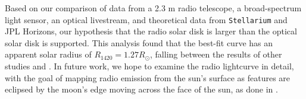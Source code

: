 Based on our comparison of data from a 2.3 m radio telescope, a broad-spectrum light sensor, an optical livestream, and theoretical data from \texttt{Stellarium} and JPL Horizons, our hypothesis that the radio solar disk is larger than the optical solar disk is supported.
This analysis found that the best-fit curve has an apparent solar radius of $R_{\mathrm{1420}} = 1.27 R_{\odot}$, falling between the results of other studies \cite{messerotti_radio_2000} and \cite{leung_solar_2022}.
In future work, we hope to examine the radio lightcurve in detail, with the goal of mapping radio emission from the sun's surface as features are eclipsed by the moon's edge moving across the face of the sun, as done in \cite{messerotti_radio_2000}.
